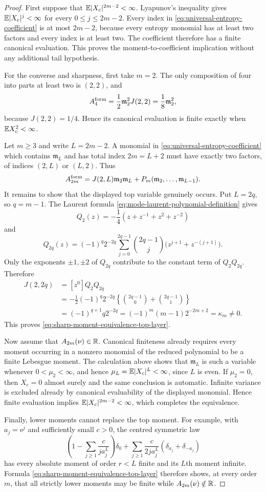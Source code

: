 \begin{proof}
First suppose that \(\mathbb{E}|X_c|^{2m-2}<\infty\).  Lyapunov's inequality gives
\(\mathbb{E}|X_c|^j<\infty\) for every \(0\le j\le2m-2\).  Every index in
\eqref{eq:universal-entropy-coefficient} is at most \(2m-2\), because every
entropy monomial has at least two factors and every index is at least two.
The coefficient therefore has a finite canonical evaluation.  This proves
the moment-to-coefficient implication without any additional tail
hypothesis.

For the converse and sharpness, first take \(m=2\).  The only composition
of four into parts at least two is \((2,2)\), and
\[
 A_4^{\rm form}=\frac12\mathfrak m_2^2J(2,2)
 =\frac18\mathfrak m_2^2,
\]
because \(J(2,2)=1/4\).  Hence its canonical evaluation is finite exactly
when \(\mathbb{E} X_c^2<\infty\).

Let \(m\ge3\) and write \(L=2m-2\).  A monomial in
\eqref{eq:universal-entropy-coefficient} which contains
\(\mathfrak m_L\) and has total index \(2m=L+2\) must have exactly two
factors, of indices \((2,L)\) or \((L,2)\).  Thus
\[
 A_{2m}^{\rm form}
 =J(2,L)\mathfrak m_2\mathfrak m_L
  +P_m(\mathfrak m_2,\ldots,\mathfrak m_{L-1}).
\]
It remains to show that the displayed top variable genuinely occurs.  Put
\(L=2q\), so \(q=m-1\).  The Laurent formula
\eqref{eq:mode-laurent-polynomial-definition} gives
\[
Q_2(z)=-\frac14(z+z^{-1}+z^2+z^{-2})
\]
and
\[
Q_{2q}(z)=(-1)^q2^{-2q}
\sum_{j=0}^{2q-1}\binom{2q-1}{j}
\bigl(z^{j+1}+z^{-(j+1)}\bigr).
\]
Only the exponents \(\pm1,\pm2\) of \(Q_{2q}\) contribute to the constant
term of \(Q_2Q_{2q}\).  Therefore
\begin{align*}
J(2,2q)
&=[z^0]Q_2Q_{2q}\\
&=-\frac12(-1)^q2^{-2q}
  \left\{\binom{2q-1}{0}+\binom{2q-1}{1}\right\}\\
&=(-1)^{q+1}q2^{-2q}
 =(-1)^m(m-1)2^{-2m+2}=\kappa_m\ne0.
\end{align*}
This proves \eqref{eq:sharp-moment-equivalence-top-layer}.

Now assume that \(A_{2m}(\nu)\in\mathbb{R}\).  Canonical finiteness already
requires every moment occurring in a nonzero monomial of the reduced
polynomial to be a finite Lebesgue moment.  The calculation above shows that
\(\mathfrak m_L\) is such a variable whenever \(0<\mu_2<\infty\), and hence
\(\mu_L=\mathbb{E}|X_c|^L<\infty\), since \(L\) is even.  If \(\mu_2=0\), then
\(X_c=0\) almost surely and the same conclusion is automatic.  Infinite
variance is excluded already by canonical evaluability of the displayed
monomial.  Hence finite evaluation implies \(\mathbb{E}|X_c|^{2m-2}<\infty\),
which completes the equivalence.

Finally, lower moments cannot replace the top moment.  For example, with
\(a_j=\mathrm e^j\) and sufficiently small \(c>0\), the centred symmetric
law
\[
\left(1-\sum_{j\ge1}\frac{c}{j a_j^L}\right)\delta_0
+\sum_{j\ge1}\frac{c}{2j a_j^L}
 (\delta_{a_j}+\delta_{-a_j})
\]
has every absolute moment of order \(r<L\) finite and its \(L\)th moment
infinite.  Formula \eqref{eq:sharp-moment-equivalence-top-layer} therefore
shows, at every order \(m\), that all strictly lower moments may be finite
while \(A_{2m}(\nu)\notin\mathbb{R}\).
\end{proof}

